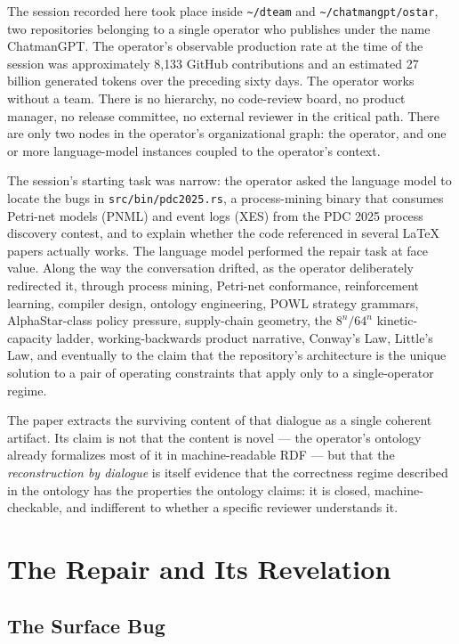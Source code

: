 \documentclass[11pt,letterpaper]{article}
\begin{document}
The session recorded here took place inside \texttt{\textasciitilde/dteam} and \texttt{\textasciitilde/chatmangpt/ostar}, two repositories belonging to a single operator who publishes under the name ChatmanGPT. The operator's observable production rate at the time of the session was approximately 8{,}133 GitHub contributions and an estimated 27 billion generated tokens over the preceding sixty days. The operator works without a team. There is no hierarchy, no code-review board, no product manager, no release committee, no external reviewer in the critical path. There are only two nodes in the operator's organizational graph: the operator, and one or more language-model instances coupled to the operator's context.

The session's starting task was narrow: the operator asked the language model to locate the bugs in \texttt{src/bin/pdc2025.rs}, a process-mining binary that consumes Petri-net models (PNML) and event logs (XES) from the PDC 2025 process discovery contest, and to explain whether the code referenced in several LaTeX papers actually works. The language model performed the repair task at face value. Along the way the conversation drifted, as the operator deliberately redirected it, through process mining, Petri-net conformance, reinforcement learning, compiler design, ontology engineering, POWL strategy grammars, AlphaStar-class policy pressure, supply-chain geometry, the \( 8^{n} / 64^{n} \) kinetic-capacity ladder, working-backwards product narrative, Conway's Law, Little's Law, and eventually to the claim that the repository's architecture is the unique solution to a pair of operating constraints that apply only to a single-operator regime.

The paper extracts the surviving content of that dialogue as a single coherent artifact. Its claim is not that the content is novel --- the operator's ontology already formalizes most of it in machine-readable RDF --- but that the \emph{reconstruction by dialogue} is itself evidence that the correctness regime described in the ontology has the properties the ontology claims: it is closed, machine-checkable, and indifferent to whether a specific reviewer understands it.

\section{The Repair and Its Revelation}

\subsection{The Surface Bug}
\end{document}
